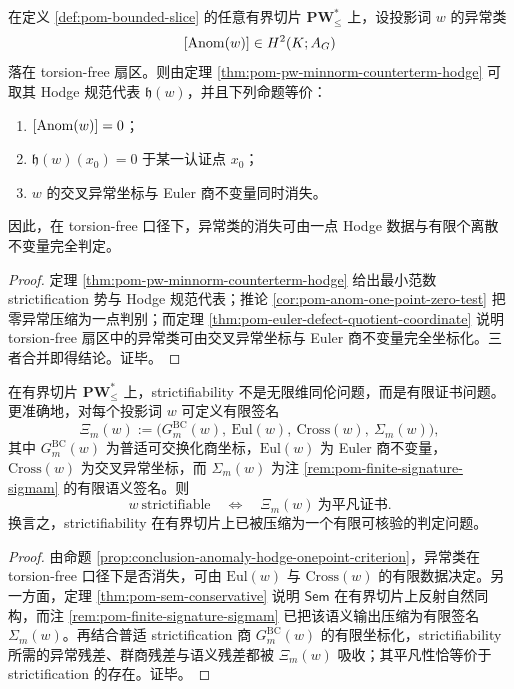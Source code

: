 \begin{proposition}\label{prop:conclusion-anomaly-hodge-onepoint-criterion}
在定义 \ref{def:pom-bounded-slice} 的任意有界切片 \(\mathbf{PW}^{\ast}_{\le}\) 上，设投影词 \(w\) 的异常类
\[
[{\rm Anom}(w)]\in H^2(K;A_G)
\]
落在 torsion-free 扇区。则由定理 \ref{thm:pom-pw-minnorm-counterterm-hodge} 可取其 Hodge 规范代表 \(\mathfrak h(w)\)，并且下列命题等价：
\begin{enumerate}
  \item \([{\rm Anom}(w)]=0\)；
  \item \(\mathfrak h(w)(x_0)=0\) 于某一认证点 \(x_0\)；
  \item \(w\) 的交叉异常坐标与 Euler 商不变量同时消失。
\end{enumerate}
因此，在 torsion-free 口径下，异常类的消失可由一点 Hodge 数据与有限个离散不变量完全判定。
\end{proposition}
\begin{proof}
定理 \ref{thm:pom-pw-minnorm-counterterm-hodge} 给出最小范数 strictification 势与 Hodge 规范代表；推论 \ref{cor:pom-anom-one-point-zero-test} 把零异常压缩为一点判别；而定理 \ref{thm:pom-euler-defect-quotient-coordinate} 说明 torsion-free 扇区中的异常类可由交叉异常坐标与 Euler 商不变量完全坐标化。三者合并即得结论。证毕。
\end{proof}

\begin{theorem}\label{thm:conclusion-strictifiability-finite-certificate-completeness}
在有界切片 \(\mathbf{PW}^{\ast}_{\le}\) 上，strictifiability 不是无限维同伦问题，而是有限证书问题。更准确地，对每个投影词 \(w\) 可定义有限签名
\[
\Xi_m(w):=
\bigl(
G^{\mathrm{BC}}_m(w),\
\mathrm{Eul}(w),\
\mathrm{Cross}(w),\
\Sigma_m(w)
\bigr),
\]
其中 \(G^{\mathrm{BC}}_m(w)\) 为普适可交换化商坐标，\(\mathrm{Eul}(w)\) 为 Euler 商不变量，\(\mathrm{Cross}(w)\) 为交叉异常坐标，而 \(\Sigma_m(w)\) 为注 \ref{rem:pom-finite-signature-sigmam} 的有限语义签名。则
\[
w\ \text{strictifiable}
\quad\Longleftrightarrow\quad
\Xi_m(w)\ \text{为平凡证书}.
\]
换言之，strictifiability 在有界切片上已被压缩为一个有限可核验的判定问题。
\end{theorem}
\begin{proof}
由命题 \ref{prop:conclusion-anomaly-hodge-onepoint-criterion}，异常类在 torsion-free 口径下是否消失，可由 \(\mathrm{Eul}(w)\) 与 \(\mathrm{Cross}(w)\) 的有限数据决定。另一方面，定理 \ref{thm:pom-sem-conservative} 说明 \(\mathsf{Sem}\) 在有界切片上反射自然同构，而注 \ref{rem:pom-finite-signature-sigmam} 已把该语义输出压缩为有限签名 \(\Sigma_m(w)\)。再结合普适 strictification 商 \(G^{\mathrm{BC}}_m(w)\) 的有限坐标化，strictifiability 所需的异常残差、群商残差与语义残差都被 \(\Xi_m(w)\) 吸收；其平凡性恰等价于 strictification 的存在。证毕。
\end{proof}

